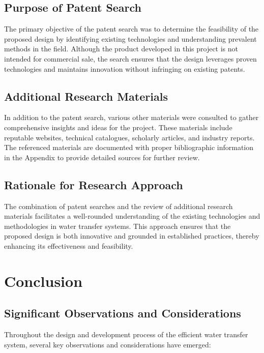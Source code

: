 \documentclass{article}
\begin{document}
\subsection{Purpose of Patent Search}
The primary objective of the patent search was to determine the feasibility of the proposed design by identifying existing technologies and understanding prevalent methods in the field. Although the product developed in this project is not intended for commercial sale, the search ensures that the design leverages proven technologies and maintains innovation without infringing on existing patents.

\subsection{Additional Research Materials}
In addition to the patent search, various other materials were consulted to gather comprehensive insights and ideas for the project. These materials include reputable websites, technical catalogues, scholarly articles, and industry reports. The referenced materials are documented with proper bibliographic information in the Appendix to provide detailed sources for further review.

\subsection{Rationale for Research Approach}
The combination of patent searches and the review of additional research materials facilitates a well-rounded understanding of the existing technologies and methodologies in water transfer systems. This approach ensures that the proposed design is both innovative and grounded in established practices, thereby enhancing its effectiveness and feasibility.

\newpage
\section{Conclusion}

\subsection{Significant Observations and Considerations}

Throughout the design and development process of the efficient water transfer system, several key observations and considerations have emerged:
\end{document}
